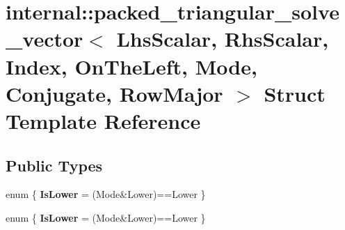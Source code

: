 \hypertarget{structinternal_1_1packed__triangular__solve__vector_3_01_lhs_scalar_00_01_rhs_scalar_00_01_indexc5a73935a3beb9907eb3aa30bec77d7b}{}\section{internal\+:\+:packed\+\_\+triangular\+\_\+solve\+\_\+vector$<$ Lhs\+Scalar, Rhs\+Scalar, Index, On\+The\+Left, Mode, Conjugate, Row\+Major $>$ Struct Template Reference}
\label{structinternal_1_1packed__triangular__solve__vector_3_01_lhs_scalar_00_01_rhs_scalar_00_01_indexc5a73935a3beb9907eb3aa30bec77d7b}
\subsection*{Public Types}
\begin{DoxyCompactItemize}
\item 
\mbox{\label{structinternal_1_1packed__triangular__solve__vector_3_01_lhs_scalar_00_01_rhs_scalar_00_01_indexc5a73935a3beb9907eb3aa30bec77d7b_a8facae8af58fe53a1764601f3e87ba18}} 
enum \{ {\bfseries Is\+Lower} = (Mode\&Lower)==Lower
 \}
\item 
\mbox{\label{structinternal_1_1packed__triangular__solve__vector_3_01_lhs_scalar_00_01_rhs_scalar_00_01_indexc5a73935a3beb9907eb3aa30bec77d7b_aeb7c9bfed48a7e2b778b2e0c8664d614}} 
enum \{ {\bfseries Is\+Lower} = (Mode\&Lower)==Lower
 \}
\end{DoxyCompactItemize}
